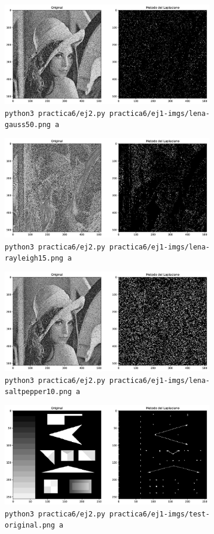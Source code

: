 \documentclass[11pt, spanish]{article}
\begin{document}
\begin{figure}[H]
\centering
    \includegraphics[height=4.5cm]{informe-imgs/ej2-a-lena-gauss50.jpg}
    \caption{\texttt{python3 practica6/ej2.py practica6/ej1-imgs/lena-gauss50.png a}}
\end{figure}

\begin{figure}[H]
\centering
    \includegraphics[height=4.5cm]{informe-imgs/ej2-a-lena-rayleigh15.jpg}
    \caption{\texttt{python3 practica6/ej2.py practica6/ej1-imgs/lena-rayleigh15.png a}}
\end{figure}

\begin{figure}[H]
\centering
    \includegraphics[height=4.5cm]{informe-imgs/ej2-a-lena-saltpepper10.jpg}
    \caption{\texttt{python3 practica6/ej2.py practica6/ej1-imgs/lena-saltpepper10.png a}}
\end{figure}


\begin{figure}[H]
\centering
    \includegraphics[height=4.5cm]{informe-imgs/ej2-a-test-original.jpg}
    \caption{\texttt{python3 practica6/ej2.py practica6/ej1-imgs/test-original.png a}}
\end{figure}
\end{document}
